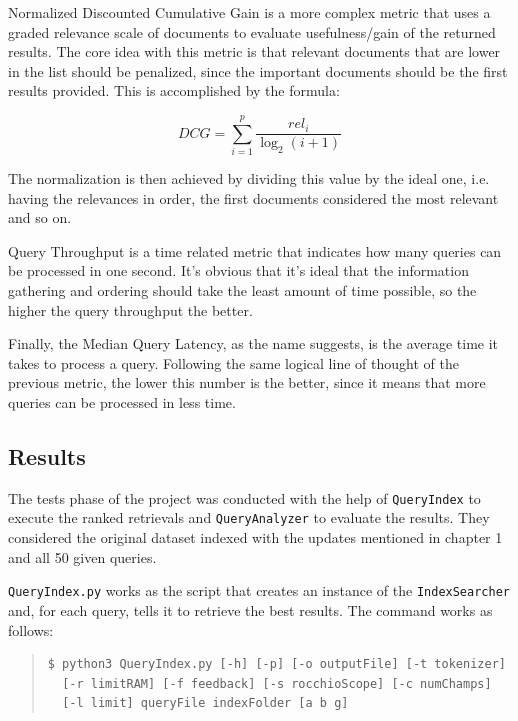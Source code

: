 \documentclass[12pt]{article}
\begin{document}
Normalized Discounted Cumulative Gain is a more complex metric that uses a graded 
relevance scale of documents to evaluate usefulness/gain of the returned results. 
The core idea with this metric is that relevant documents that are lower in the 
list should be penalized, since the important documents should be the first 
results provided. 
This is accomplished by the formula:

\begin{equation}
  DCG = \sum_{i=1}^{p} \frac{rel_{i}}{\log_{2}(i+1)}
\end{equation}

The normalization is then achieved by dividing this value by the ideal one, i.e.
having the relevances in order, the first documents considered the most relevant 
and so on.

Query Throughput is a time related metric that indicates how many queries can be 
processed in one second. 
It's obvious that it's ideal that the information gathering and ordering should 
take the least amount of time possible, so the higher the query throughput the better.

Finally, the Median Query Latency, as the name suggests, is the average time it
takes to process a query. 
Following the same logical line of thought of the previous metric, the lower 
this number is the better, since it means that more queries can be processed in 
less time.

\subsection{Results}\label{results}

The tests phase of the project was conducted with the help of \texttt{QueryIndex}
to execute the ranked retrievals and \texttt{QueryAnalyzer} to evaluate the results.
They considered the original dataset indexed with the updates mentioned in chapter 
1 and all 50 given queries.

\texttt{QueryIndex.py} works as the script that creates an instance of the 
\texttt{IndexSearcher} and, for each query, tells it to retrieve the best results.
The command works as follows:

\begingroup
\addtolength\leftmargini{-0.4in}
\addtolength\baselineskip{-0.05in}
\begin{quote}
\begin{verbatim}
$ python3 QueryIndex.py [-h] [-p] [-o outputFile] [-t tokenizer] 
  [-r limitRAM] [-f feedback] [-s rocchioScope] [-c numChamps] 
  [-l limit] queryFile indexFolder [a b g]
\end{verbatim}
\end{quote}
\endgroup
\end{document}
